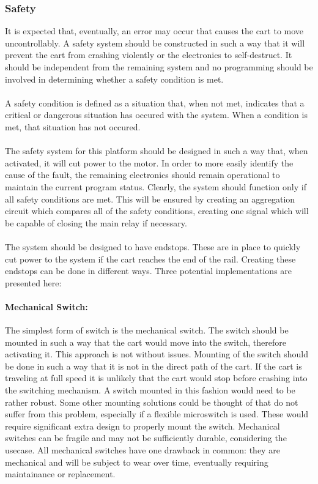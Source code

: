 \subsubsection{Safety} %
\label{subsub:safety}
It is expected that, eventually, an error may occur that causes the cart to move uncontrollably.
A safety system should be constructed in such a way that it will prevent the cart from crashing violently or the electronics to self-destruct.
It should be independent from the remaining system and no programming should be involved in determining whether a safety condition is met.
\\~\\
A safety condition is defined as a situation that, when not met, indicates that a critical or dangerous situation has occured with the system.
When a condition is met, that situation has not occured.
\\~\\
The safety system for this platform should be designed in such a way that, when activated, it will cut power to the motor.
In order to more easily identify the cause of the fault, the remaining electronics should remain operational to maintain the current program status.
Clearly, the system should function only if all safety conditions are met.
This will be ensured by creating an aggregation circuit which compares all of the safety conditions, creating one signal which will be capable of closing the main relay if necessary.
\\~\\
The system should be designed to have endstops.
These are in place to quickly cut power to the system if the cart reaches the end of the rail.
Creating these endstops can be done in different ways.
Three potential implementations are presented here:
\paragraph{Mechanical Switch:} %
\label{par:mechanical_switch}
The simplest form of switch is the mechanical switch.
The switch should be mounted in such a way that the cart would move into the switch, therefore activating it.
This approach is not without issues.
Mounting of the switch should be done in such a way that it is not in the direct path of the cart.
If the cart is traveling at full speed it is unlikely that the cart would stop before crashing into the switching mechanism.
A switch mounted in this fashion would need to be rather robust.
Some other mounting solutions could be thought of that do not suffer from this problem, especially if a flexible microswitch is used.
These would require significant extra design to properly mount the switch.
Mechanical switches can be fragile and may not be sufficiently durable, considering the usecase.
All mechanical switches have one drawback in common: they are mechanical and will be subject to wear over time, eventually requiring maintainance or replacement.

